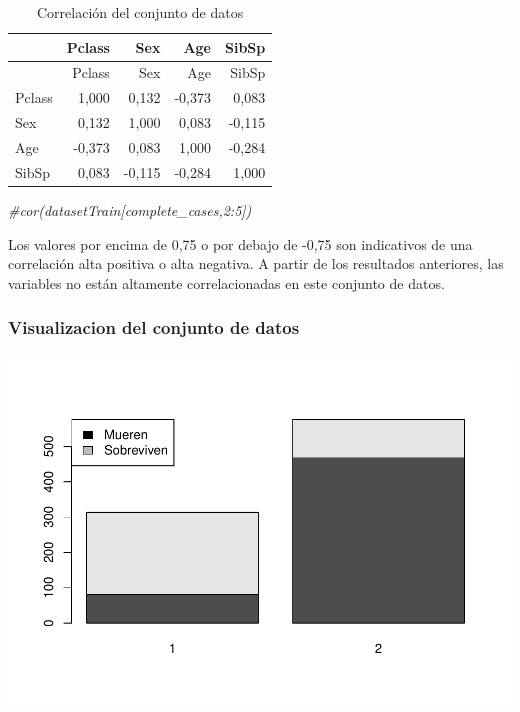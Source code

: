 \documentclass[]{article}
\newenvironment{Shaded}{\begin{snugshade}}{\end{snugshade}}
\newcommand{\KeywordTok}[1]{\textcolor[rgb]{0.13,0.29,0.53}{\textbf{#1}}}
\newcommand{\DataTypeTok}[1]{\textcolor[rgb]{0.13,0.29,0.53}{#1}}
\newcommand{\DecValTok}[1]{\textcolor[rgb]{0.00,0.00,0.81}{#1}}
\newcommand{\StringTok}[1]{\textcolor[rgb]{0.31,0.60,0.02}{#1}}
\newcommand{\CommentTok}[1]{\textcolor[rgb]{0.56,0.35,0.01}{\textit{#1}}}
\newcommand{\OperatorTok}[1]{\textcolor[rgb]{0.81,0.36,0.00}{\textbf{#1}}}
\newcommand{\NormalTok}[1]{#1}
\begin{document}
\begin{longtable}[]{@{}lrrrr@{}}
\caption{Correlación del conjunto de datos}\tabularnewline
\toprule
& Pclass & Sex & Age & SibSp\tabularnewline
\midrule
\endfirsthead
\toprule
& Pclass & Sex & Age & SibSp\tabularnewline
\midrule
\endhead
Pclass & 1,000 & 0,132 & -0,373 & 0,083\tabularnewline
Sex & 0,132 & 1,000 & 0,083 & -0,115\tabularnewline
Age & -0,373 & 0,083 & 1,000 & -0,284\tabularnewline
SibSp & 0,083 & -0,115 & -0,284 & 1,000\tabularnewline
\bottomrule
\end{longtable}

\begin{Shaded}
\begin{Highlighting}[]
\CommentTok{#cor(datasetTrain[complete_cases,2:5])}
\end{Highlighting}
\end{Shaded}

Los valores por encima de 0,75 o por debajo de -0,75 son indicativos de
una correlación alta positiva o alta negativa. A partir de los
resultados anteriores, las variables no están altamente correlacionadas
en este conjunto de datos.

\subsubsection{Visualizacion del conjunto de
datos}\label{visualizacion-del-conjunto-de-datos}

\begin{Shaded}
\end{Shaded}

\includegraphics{titanicDataClean_files/figure-latex/datasetTrain_plot_01-1.pdf}
\end{document}
